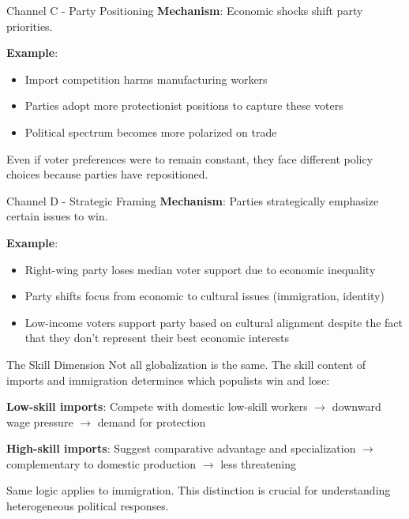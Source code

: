 \documentclass{beamer}
\begin{document}
\begin{frame}{Channel C - Party Positioning}
\textbf{Mechanism}: Economic shocks shift party priorities.
\vspace{0.3cm}

\textbf{Example}: 
\begin{itemize}
    \item Import competition harms manufacturing workers
    \item[$\rightarrow$] Parties adopt more protectionist positions to capture these voters
    \item[$\rightarrow$] Political spectrum becomes more polarized on trade
\end{itemize}
\vspace{0.3cm}
Even if voter preferences were to remain constant, they face different policy choices because parties have repositioned. %
\end{frame}

\begin{frame}{Channel D - Strategic Framing}
\textbf{Mechanism}: Parties strategically emphasize certain issues to win.
\vspace{0.3cm}

\textbf{Example}: 
\begin{itemize}
    \item Right-wing party loses median voter support due to economic inequality %
    \item[$\rightarrow$] Party shifts focus from economic to cultural issues (immigration, identity)
    \item[$\rightarrow$] Low-income voters support party based on cultural alignment despite the fact that they don't represent their best economic interests
\end{itemize}
\end{frame}

\begin{frame}{The Skill Dimension}
Not all globalization is the same. The skill content of imports and immigration determines which populists win and lose:
\vspace{0.3cm}

\textbf{Low-skill imports}: Compete with domestic low-skill workers $\rightarrow$ downward wage pressure $\rightarrow$ demand for protection
\vspace{0.3cm}

\textbf{High-skill imports}: Suggest comparative advantage and specialization $\rightarrow$ complementary to domestic production $\rightarrow$ less threatening
\vspace{0.3cm}

Same logic applies to immigration. This distinction is crucial for understanding heterogeneous political responses.
\end{frame}
\end{document}
